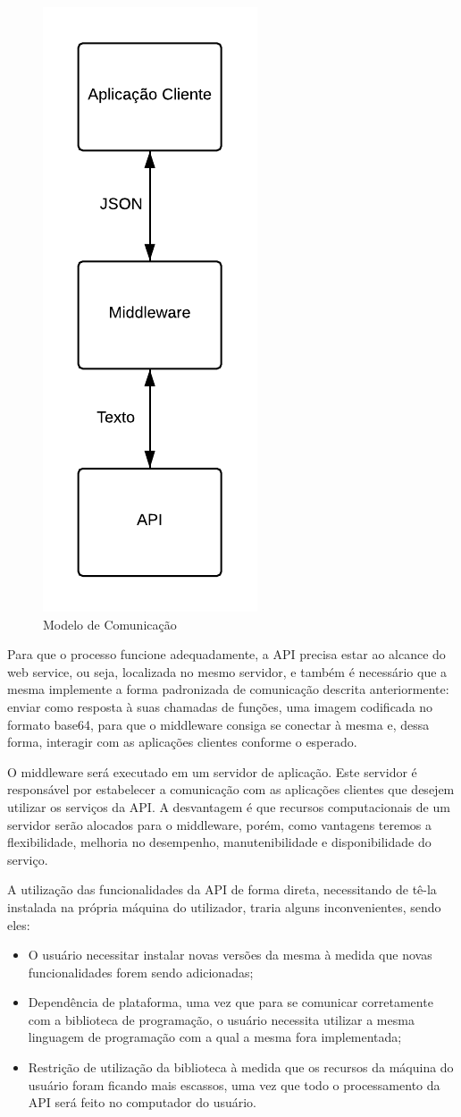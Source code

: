\documentclass[12pt]{article}
\begin{document}
\begin{figure}[ht]
	\centering
	\includegraphics[width=.2\textwidth]{modelo-comunicacao.png}
	\caption{Modelo de Comunicação}
	\label{fig:Figura2}
\end{figure}

Para que o processo funcione adequadamente, a API precisa estar ao alcance do web service, ou seja, localizada no mesmo servidor, e também é necessário que a mesma implemente a forma padronizada de comunicação descrita anteriormente: enviar como resposta à suas chamadas de funções, uma imagem codificada no formato base64, para que o
middleware consiga se conectar à mesma e, dessa forma, interagir com as aplicações clientes conforme o esperado.

O middleware será executado em um servidor de aplicação. Este servidor
é responsável por estabelecer a comunicação com as aplicações clientes que desejem utilizar os serviços da API. 
A desvantagem é que recursos computacionais de um servidor serão alocados para o middleware, porém, como vantagens teremos a flexibilidade, melhoria no desempenho, manutenibilidade e disponibilidade do serviço.

A utilização das funcionalidades da API de forma direta, necessitando de tê-la instalada na própria máquina do utilizador, traria alguns inconvenientes, sendo eles:
\begin{itemize}
	\item O usuário necessitar instalar novas versões da mesma à medida que novas funcionalidades forem sendo adicionadas;
	\item Dependência de plataforma, uma vez que para se comunicar corretamente com a biblioteca de programação, o usuário necessita utilizar a mesma linguagem de programação com a qual a mesma fora implementada;
	\item Restrição de utilização da biblioteca à medida que os recursos da máquina do usuário foram ficando mais escassos, uma vez que todo o processamento da API será feito no computador do usuário.
\end{itemize}
\end{document}
